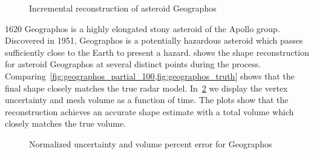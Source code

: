 \begin{figure}[htbp]
    \caption[Asteroid Geographos incremental reconstruction]{Incremental reconstruction of asteroid Geographos~\label{fig:geographos_reconstruction}}
\end{figure}

\num{1620} Geographos is a highly elongated stony asteroid of the Apollo group.
Discovered in \num{1951}, Geographos is a potentially hazardous asteroid which passes sufficiently close to the Earth to present a hazard.
 shows the shape reconstruction for asteroid Geographos at several distinct points during the process.
Comparing~\cref{fig:geographos_partial_100,fig:geographos_truth} shows that the final shape closely matches the true radar model.
In~\cref{fig:geographos_metrics} we display the vertex uncertainty and mesh volume as a function of time.
The plots show that the reconstruction achieves an accurate shape estimate with a total volume which closely matches the true volume.

\begin{figure}[htbp]
    \centering
    
    \caption{Normalized uncertainty and volume percent error for Geographos\label{fig:geographos_metrics}}
\end{figure}


